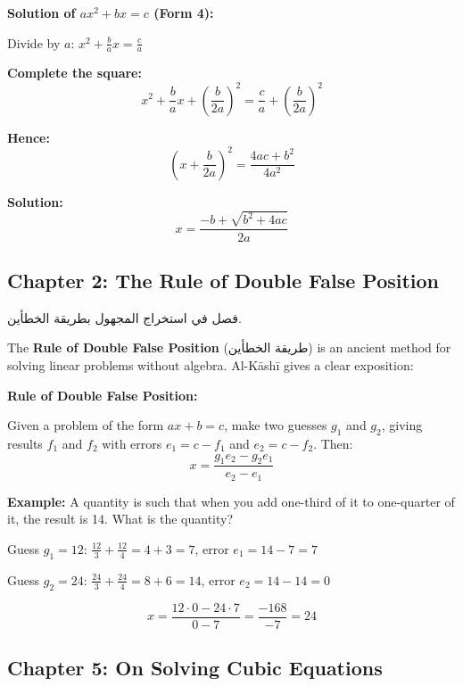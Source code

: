 \documentclass[11pt,a4paper]{article}
\newenvironment{arabicbox}{%
  \begin{framed}
  \begin{minipage}{\dimexpr\linewidth-2\fboxsep-2\fboxrule\relax}
  \setlength{\parindent}{0pt}
  \linespread{1.3}\selectfont
}{%
  \end{minipage}
  \end{framed}
}
\newenvironment{mathalgo}{%
  \par\vspace{0.3cm}
  \begin{framed}
  \setlength{\parindent}{0pt}
}{%
  \end{framed}
  \par\vspace{0.3cm}
}
\newcommand{\ar}[1]{{\arabicfont\beginR #1\endR}}
\begin{document}
\begin{mathalgo}
\textbf{Solution of $ax^2 + bx = c$ (Form 4):}

Divide by $a$: $x^2 + \frac{b}{a}x = \frac{c}{a}$

\textbf{Complete the square:}
\[
x^2 + \frac{b}{a}x + \left(\frac{b}{2a}\right)^2 = \frac{c}{a} +
\left(\frac{b}{2a}\right)^2
\]

\textbf{Hence:}
\[
\left(x + \frac{b}{2a}\right)^2 = \frac{4ac + b^2}{4a^2}
\]

\textbf{Solution:}
\[
x = \frac{-b + \sqrt{b^2 + 4ac}}{2a}
\]
\end{mathalgo}

\subsection{Chapter 2: The Rule of Double False Position}

\begin{arabicbox}
\begin{Arabic}
فصل في استخراج المجهول بطريقة الخطأين.
\end{Arabic}
\end{arabicbox}

\vspace{0.3cm}

The \textbf{Rule of Double False Position} (\ar{طريقة الخطأين}) is an
ancient method for solving linear problems without algebra. Al-K\=ash\=i
gives a clear exposition:

\begin{mathalgo}
\textbf{Rule of Double False Position:}

Given a problem of the form $ax + b = c$, make two guesses $g_1$ and
$g_2$, giving results $f_1$ and $f_2$ with errors $e_1 = c - f_1$ and
$e_2 = c - f_2$. Then:
\[
x = \frac{g_1 e_2 - g_2 e_1}{e_2 - e_1}
\]

\textbf{Example:} A quantity is such that when you add one-third of it
  to one-quarter of it, the result is 14. What is the quantity?

Guess $g_1 = 12$: $\frac{12}{3} + \frac{12}{4} = 4 + 3 = 7$, error $e_1
= 14 - 7 = 7$

Guess $g_2 = 24$: $\frac{24}{3} + \frac{24}{4} = 8 + 6 = 14$, error $e_2
= 14 - 14 = 0$

\[
x = \frac{12 \cdot 0 - 24 \cdot 7}{0 - 7} = \frac{-168}{-7} = 24
\]
\end{mathalgo}

\subsection{Chapter 5: On Solving Cubic Equations}
\end{document}
